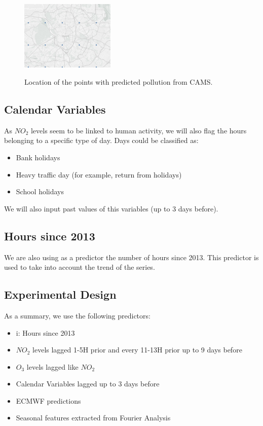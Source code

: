 \documentclass[a4paper,twocolumn,5p]{elsarticle}
\begin{document}
\begin{figure}
  \centering
  \includegraphics[width=0.4\textwidth]{camspoints}
  \label{figure:camspoints}
  \caption{Location of the points with predicted pollution from CAMS.}
\end{figure}

\subsection{Calendar Variables}
\label{sec:cal_data}

As $NO_2$ levels seem to be linked to human activity, we will also flag the hours 
belonging to a specific type of day. Days could be classified as:
\begin{itemize}
  \item Bank holidays
  \item Heavy traffic day (for example, return from holidays)
  \item School holidays
\end{itemize} 

We will also input past values of this variables (up to 3 days before).

\subsection{Hours since 2013}

We are also using as a predictor the number of hours since 2013. 
This predictor is used to take into account the trend of 
the series.

\subsection{Experimental Design}
\label{sec:experimental-design}

As a summary, we use the following predictors:
\begin{itemize}
  \item i: Hours since 2013
  \item $NO_2$ levels lagged 1-5H prior and every 11-13H prior up to 9 days before
  \item $O_3$ levels lagged like $NO_2$
  \item Calendar Variables lagged up to 3 days before
  \item ECMWF predictions
  \item Seasonal features extracted from Fourier Analysis
\end{itemize}
\end{document}
